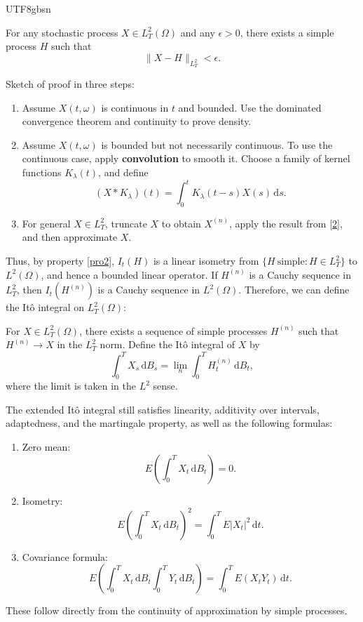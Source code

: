 \documentclass{article}
\begin{document}
\begin{CJK*}{UTF8}{gbsn}
\begin{theorem}
For any stochastic process $X\in L^2_T(\Omega)$ and any $\epsilon>0$, there exists a simple process $H$ such that
    $$
    \|X-H\|_{L_T^2}<\epsilon.
    $$
\end{theorem}

Sketch of proof in three steps:
\begin{enumerate}
    \item Assume $X(t,\omega)$ is continuous in $t$ and bounded. Use the dominated convergence theorem and continuity to prove density.
    \item Assume $X(t,\omega)$ is bounded but not necessarily continuous.\label{2} To use the continuous case, apply \textbf{convolution} to smooth it. Choose a family of kernel functions $K_\lambda(t)$, and define
    $$
    (X*K_\lambda)(t)=\int_0^tK_\lambda(t-s)X(s)\,\mathrm{d}s.
    $$
    \item For general $X\in L_T^2$, truncate $X$ to obtain $X^{(n)}$, apply the result from \ref{2}, and then approximate $X$.
\end{enumerate}

Thus, by property \ref{pro2}, $I_t(H)$ is a linear isometry from $\{H\ \text{simple}:H\in L_T^2\}$ to $L^2(\Omega)$, and hence a bounded linear operator. If $H^{(n)}$ is a Cauchy sequence in $L_T^2$, then $I_t(H^{(n)})$ is a Cauchy sequence in $L^2(\Omega)$. Therefore, we can define the Itô integral on $L^2_T(\Omega)$:

\begin{definition}
For $X\in L^2_T(\Omega)$, there exists a sequence of simple processes $H^{(n)}$ such that $H^{(n)}\to X$ in the $L_T^2$ norm. Define the Itô integral of $X$ by
    $$
    \int_0^T X_s\,\mathrm{d}B_s=\lim_n\int_0^T H_t^{(n)}\,\mathrm{d}B_t,
    $$
where the limit is taken in the $L^2$ sense.
\end{definition}

The extended Itô integral still satisfies linearity, additivity over intervals, adaptedness, and the martingale property, as well as the following formulas:
\begin{enumerate}
    \item Zero mean:
    $$E\!\left(\int_0^T X_t\,\mathrm{d}B_t\right)=0.$$
    \item Isometry:
    $$
    E\!\left(\int_0^T X_t\,\mathrm{d}B_t\right)^2=\int_0^T E|X_t|^2\,\mathrm{d}t.
    $$
    \item Covariance formula:
    $$
    E\!\left(\int_0^T X_t\,\mathrm{d}B_t\int_0^T Y_t\,\mathrm{d}B_t\right)=\int_0^T E(X_tY_t)\,\mathrm{d}t.
    $$
\end{enumerate}
These follow directly from the continuity of approximation by simple processes.


\end{CJK*}
\end{document}
